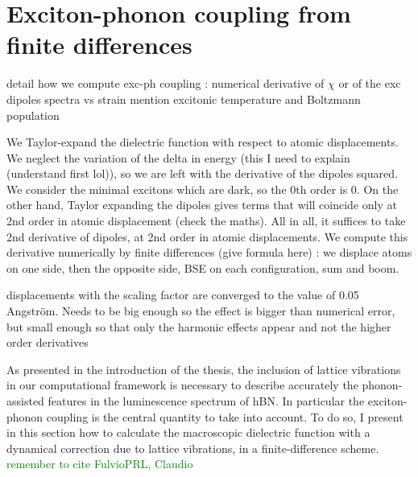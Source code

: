 %
\section{Exciton-phonon coupling from finite differences}
detail how we compute exc-ph coupling : numerical derivative of $\chi$ or of the exc dipoles  
spectra vs strain
mention excitonic temperature and Boltzmann population

We Taylor-expand the dielectric function with respect to atomic displacements. We neglect the variation of the delta in energy (this I need to explain (understand first lol)), so we are left with the derivative of the dipoles squared. We consider the minimal excitons which are dark, so the 0th order is 0. On the other hand, Taylor expanding the dipoles gives terms that will coincide only at 2nd order in atomic displacement (check the maths). All in all, it suffices to take 2nd derivative of dipoles, at 2nd order in atomic displacements. We compute this derivative numerically by finite differences (give formula here) : we displace atoms on one side, then the opposite side, BSE on each configuration, sum and boom. 


displacements with the scaling factor are converged to the value of 0.05 Angström. Needs to be big enough so the effect is bigger than numerical error, but small enough so that only the harmonic effects appear and not the higher order derivatives
%

As presented in the introduction of the thesis, the inclusion of lattice vibrations in our computational framework is necessary to describe accurately the phonon-assisted features in the luminescence spectrum of hBN. In particular the exciton-phonon coupling is the central quantity to take into account. To do so, I present in this section how to calculate the macroscopic dielectric function with a dynamical correction due to lattice vibrations, in a finite-difference scheme. \textcolor{green}{remember to cite FulvioPRL, Claudio}

